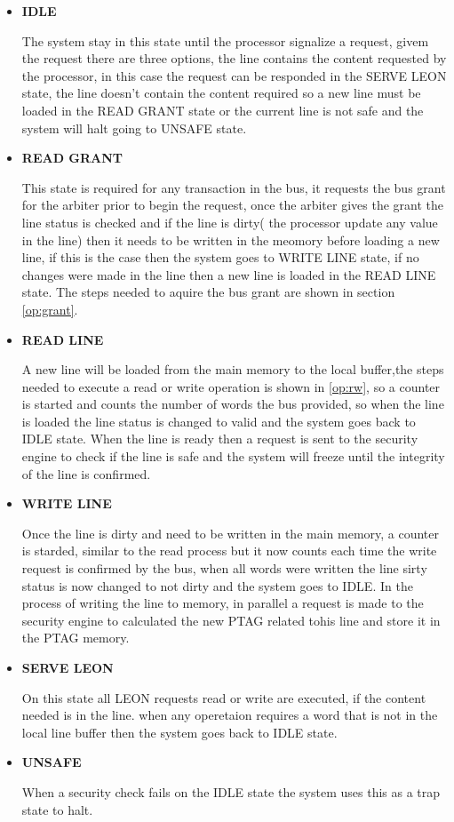 \begin{itemize}
 \item{\textbf{IDLE}}
 
 The system stay in this state  until the processor signalize a request, givem the request 
 there are three options, the line contains the content requested by the processor, in this case
 the request can be responded in the SERVE LEON state, the line doesn't contain the content required
 so a new line must be loaded in the READ GRANT state or the current line is not safe and the system will halt
 going to UNSAFE state.
 
  \item{\textbf{READ GRANT}}
  
  This state is required for any transaction in the bus, it requests the bus grant for the arbiter prior to 
  begin the request, once the arbiter gives the grant the line status is checked and if the line is dirty( the processor
  update any value in the line) then it needs to be written in the meomory before loading a new line, if this is the case
   then the system goes to WRITE LINE state, if no changes were made in the line then a new line is loaded in the READ LINE 
   state. The steps needed to aquire the bus grant are shown in section \ref{op:grant}.
  
  \item{\textbf{READ LINE}}
  
  
  A new line will be loaded from the main memory to the local buffer,the  steps needed to execute
   a read or write operation is shown  in \ref{op:rw}, so a counter is started and counts the 
  number of words the bus provided, so when the line is loaded the line status is changed to valid and
  the system goes back to IDLE state. When  the line is ready  then a request is sent to the security engine 
  to check if the line is safe and the system will freeze until the integrity of the line is confirmed.

 \item{\textbf{WRITE LINE}}
 
 Once the line is dirty and need to be written in the main memory, a counter is  starded, similar to the read process 
 but it now counts each time the write request is confirmed by the bus, when all words were written  the line sirty status 
 is now changed to not dirty and the system goes to IDLE. In the process of writing the line to memory, in parallel a request is made 
 to the security engine to calculated the new PTAG related tohis line and store it in the PTAG memory.

 \item{\textbf{SERVE LEON}}

 On this state  all LEON requests  read or write are executed, if the content needed is  in the line. 
 when any operetaion requires a word  that is not in the local line buffer then the system  goes back to IDLE state.
 
 
 \item{\textbf{UNSAFE}}
 
 
When a security check fails  on the IDLE state the system uses this as a trap state to halt.

\end{itemize}




